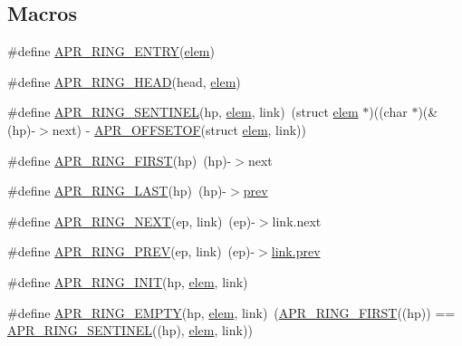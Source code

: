 \subsection*{Macros}
\begin{DoxyCompactItemize}
\item 
\#define \hyperlink{group__apr__ring_ga095edad4bcb6975014ed9584930f7819}{A\+P\+R\+\_\+\+R\+I\+N\+G\+\_\+\+E\+N\+T\+RY}(\hyperlink{structelem}{elem})
\item 
\#define \hyperlink{group__apr__ring_ga2953b8d4034077c4020616282e6c0b67}{A\+P\+R\+\_\+\+R\+I\+N\+G\+\_\+\+H\+E\+AD}(head,  \hyperlink{structelem}{elem})
\item 
\#define \hyperlink{group__apr__ring_ga54210090292ebafcd0a0d75d9ff1563d}{A\+P\+R\+\_\+\+R\+I\+N\+G\+\_\+\+S\+E\+N\+T\+I\+N\+EL}(hp,  \hyperlink{structelem}{elem},  link)~(struct \hyperlink{structelem}{elem} $\ast$)((char $\ast$)(\&(hp)-\/$>$next) -\/ \hyperlink{group__apr__general_gac16b1187b6ea63706c5dd48c88323dec}{A\+P\+R\+\_\+\+O\+F\+F\+S\+E\+T\+OF}(struct \hyperlink{structelem}{elem}, link))
\item 
\#define \hyperlink{group__apr__ring_gacacd9cfca24feb7ff754d4008422efcb}{A\+P\+R\+\_\+\+R\+I\+N\+G\+\_\+\+F\+I\+R\+ST}(hp)~(hp)-\/$>$next
\item 
\#define \hyperlink{group__apr__ring_ga8b927069ba9dc13defaf45a87267b5d3}{A\+P\+R\+\_\+\+R\+I\+N\+G\+\_\+\+L\+A\+ST}(hp)~(hp)-\/$>$\hyperlink{group__MOD__DAV_gacc5462e7a268b365a64468a6cf83b727}{prev}
\item 
\#define \hyperlink{group__apr__ring_gae42e4f7148719aa534bdbbc82be26a06}{A\+P\+R\+\_\+\+R\+I\+N\+G\+\_\+\+N\+E\+XT}(ep,  link)~(ep)-\/$>$link.\+next
\item 
\#define \hyperlink{group__apr__ring_ga82d45623d505d59ea5619cf8f63d0ebb}{A\+P\+R\+\_\+\+R\+I\+N\+G\+\_\+\+P\+R\+EV}(ep,  link)~(ep)-\/$>$\hyperlink{group__MOD__DAV_gacc5462e7a268b365a64468a6cf83b727}{link.\+prev}
\item 
\#define \hyperlink{group__apr__ring_ga245e1a73b162a4a68ebd54c84683729d}{A\+P\+R\+\_\+\+R\+I\+N\+G\+\_\+\+I\+N\+IT}(hp,  \hyperlink{structelem}{elem},  link)
\item 
\#define \hyperlink{group__apr__ring_ga9b64ad6eebea19f896d2aa90172b6b9a}{A\+P\+R\+\_\+\+R\+I\+N\+G\+\_\+\+E\+M\+P\+TY}(hp,  \hyperlink{structelem}{elem},  link)~(\hyperlink{group__apr__ring_gacacd9cfca24feb7ff754d4008422efcb}{A\+P\+R\+\_\+\+R\+I\+N\+G\+\_\+\+F\+I\+R\+ST}((hp)) == \hyperlink{group__apr__ring_ga54210090292ebafcd0a0d75d9ff1563d}{A\+P\+R\+\_\+\+R\+I\+N\+G\+\_\+\+S\+E\+N\+T\+I\+N\+EL}((hp), \hyperlink{structelem}{elem}, link))

\end{DoxyCompactItemize}
